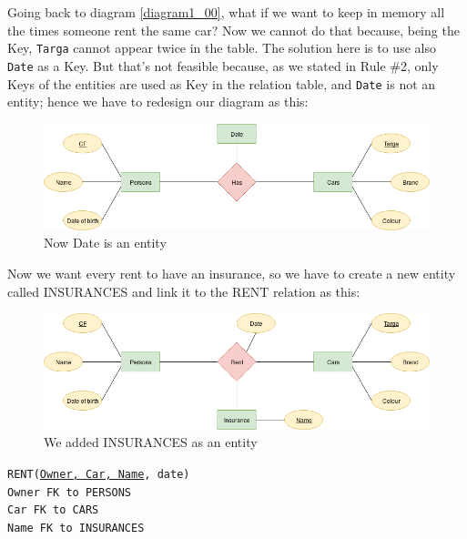 \documentclass[12pt, oneside]{report}
\newcommand\tab[1][1cm]{\hspace*{#1}}
\begin{document}
Going back to diagram \ref{diagram1_00}, what if we want to keep in memory all the times someone rent the same car?
Now we cannot do that because, being the Key, \texttt{Targa} cannot appear twice in the table.
The solution here is to use also \texttt{Date} as a Key.
But that's not feasible because, as we stated in Rule \#2, only Keys of the entities are used as Key in the relation table, and \texttt{Date} is not an entity; hence we have to redesign our diagram as this:
\begin{figure}[H]
	\centering
	\includegraphics[width=\textwidth,keepaspectratio]{diagram1_03.png}
	\caption{Now Date is an entity}
	\label{diagram1_03}
\end{figure}
\vskip 20pt

Now we want every rent to have an insurance, so we have to create a new entity called INSURANCES and link it to the RENT relation as this:
\begin{figure}[H]
	\centering
	\includegraphics[width=\textwidth,keepaspectratio]{diagram1_04.png}
	\caption{We added INSURANCES as an entity}
	\label{diagram1_04}
\end{figure}
\hspace{0.25\textwidth}
\begin{minipage}{0.5\textwidth}
	\texttt{RENT(\underline{Owner, Car, Name}, date)}\\
		\tab[.8cm] \texttt{Owner FK to PERSONS}\\
		\tab[.8cm] \texttt{Car FK to CARS}\\
		\tab[.8cm] \texttt{Name FK to INSURANCES}
\end{minipage}
\vskip 20pt
\end{document}
